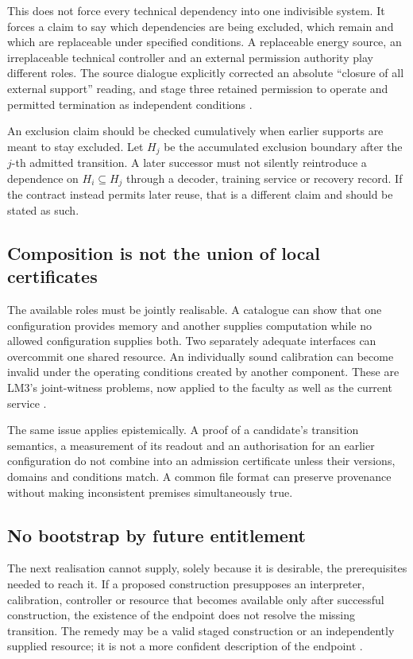 This does not force every technical dependency into one indivisible system. It forces a claim to say which dependencies are being excluded, which remain and which are replaceable under specified conditions. A replaceable energy source, an irreplaceable technical controller and an external permission authority play different roles. The source dialogue explicitly corrected an absolute ``closure of all external support'' reading, and stage three retained permission to operate and permitted termination as independent conditions \cite[07:08:04--07:18:51]{D}\cite[\S12.2]{S3}.

An exclusion claim should be checked cumulatively when earlier supports are meant to stay excluded. Let \(H_j\) be the accumulated exclusion boundary after the \(j\)-th admitted transition. A later successor must not silently reintroduce a dependence on \(H_i\subseteq H_j\) through a decoder, training service or recovery record. If the contract instead permits later reuse, that is a different claim and should be stated as such.

\subsection{Composition is not the union of local certificates}

The available roles must be jointly realisable. A catalogue can show that one configuration provides memory and another supplies computation while no allowed configuration supplies both. Two separately adequate interfaces can overcommit one shared resource. An individually sound calibration can become invalid under the operating conditions created by another component. These are LM3's joint-witness problems, now applied to the faculty as well as the current service \cite[\S12]{LM3}.

The same issue applies epistemically. A proof of a candidate's transition semantics, a measurement of its readout and an authorisation for an earlier configuration do not combine into an admission certificate unless their versions, domains and conditions match. A common file format can preserve provenance without making inconsistent premises simultaneously true.

\subsection{No bootstrap by future entitlement}

The next realisation cannot supply, solely because it is desirable, the prerequisites needed to reach it. If a proposed construction presupposes an interpreter, calibration, controller or resource that becomes available only after successful construction, the existence of the endpoint does not resolve the missing transition. The remedy may be a valid staged construction or an independently supplied resource; it is not a more confident description of the endpoint \cite[\S12.3]{LM3}.

